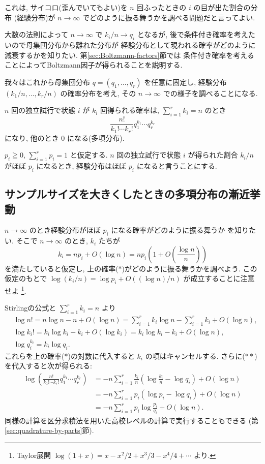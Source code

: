 \documentclass[12pt,twoside]{jarticle}
\theoremstyle{jplain}
\theoremstyle{jplain}
\theoremstyle{jplain}
\numberwithin{theorem}{section}
\numberwithin{equation}{section}
\numberwithin{figure}{section}
\numberwithin{table}{section}
\newcommand\secref[1]{第\ref{#1}節}
\begin{document}
これは, サイコロ(歪んでいてもよい)を $n$ 回ふったときの $i$ の目が出た割合の分布
(経験分布)が $n\to\infty$ でどのように振る舞うかを調べる問題だと言ってよい.

大数の法則によって $n\to\infty$ で $k_i/n\to q_i$ となるが,
後で条件付き確率を考えたいので母集団分布から離れた分布が
経験分布として現われる確率がどのように減衰するかを知りたい.
\secref{sec:Boltzmann-factors}では
条件付き確率を考えることによってBoltzmann因子が得られることを説明する.

我々はこれから母集団分布 $q=(q_1,\ldots,q_r)$ を任意に固定し, 
経験分布 $(k_1/n,\ldots,k_r/n)$ の確率分布を考え,
その $n\to\infty$ での様子を調べることになる.

$n$ 回の独立試行で状態 $i$ が $k_i$ 回得られる確率は, 
$\sum_{i=1}^r k_i=n$ のとき
\[
\frac{n!}{k_1!\cdots k_r!} q_1^{k_1}\cdots q_r^{k_r}
\tag{$*$}
\]
になり, 他のとき $0$ になる(多項分布).

$p_i\geqq 0$, $\sum_{i=1}^r p_i=1$ と仮定する.
$n$ 回の独立試行で状態 $i$ が得られた割合 $k_i/n$ がほぼ $p_i$ になるとき, 
経験分布はほぼ $p_i$ になると言うことにする.


\subsection{サンプルサイズを大きくしたときの多項分布の漸近挙動}
\label{sec:log}

$n\to\infty$ のとき経験分布がほぼ $p_i$ になる確率がどのように振る舞うか
を知りたい. そこで $n\to\infty$ のとき, $k_i$ たちが
\[
k_i= np_i+O(\log n) = np_i\left(1 + O\left(\frac{\log n}{n}\right)\right) 
\tag{$**$}
\]
を満たしていると仮定し, 上の確率($*$)がどのように振る舞うかを調べよう.
この仮定のもとで $\log(k_i/n)=\log p_i+O((\log n)/n)$ が成立することに注意せよ%
\footnote{Taylor展開 $\log(1+x)=x-x^2/2+x^3/3-x^4/4+\cdots$ より.}.

Stirlingの公式と $\sum_{i=1}^r k_i=n$ より
\begin{align*}
&
\log n! 
= n\log n - n + O(\log n)
= \sum_{i=1}^r k_i\log n - \sum_{i=1}^r k_i + O(\log n), 
\\ &
\log k_i! 
= k_i\log k_i - k_i + O(\log k_i) 
= k_i\log k_i - k_i + O(\log n),
\\ &
\log q_i^{k_i} = k_i\log q_i.
\end{align*}
これらを上の確率($*$)の対数に代入すると $k_i$ の項はキャンセルする.
さらに($**$)を代入すると次が得られる:
\begin{align*}
\log\left(\frac{n!}{k_1!\cdots k_r!} q_1^{k_1}\cdots q_r^{k_r}\right)
&
=
- n\sum_{i=1}^r \frac{k_i}{n}\left(\log\frac{k_i}{n}-\log q_i\right) 
+ O(\log n)
\\ &
= -n\sum_{i=1}^r p_i(\log p_i - \log q_i)+O(\log n)
\\ &
= -n\sum_{i=1}^r p_i\log\frac{p_i}{q_i}+O(\log n).
\end{align*}
同様の計算を区分求積法を用いた高校レベルの計算で実行することもできる
(\secref{sec:quadrature-by-parts}).
\end{document}
